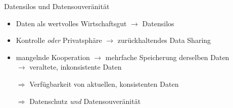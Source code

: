 \begin{frame}{Datensilos und Datensouveränität}
    \begin{itemize}
        \item Daten als wertvolles Wirtschaftsgut $\to$ Datensilos
        \item Kontrolle \emph{oder} Privatsphäre $\to$ zurückhaltendes Data Sharing
        \item mangelnde Kooperation $\to$ mehrfache Speicherung derselben Daten\\
              $\to$ veraltete, inkonsistente Daten
        
        \item[$\Rightarrow$] Verfügbarkeit von aktuellen, konsistenten Daten
        \item[$\Rightarrow$] Datenschutz \emph{und} Datensouveränität
    \end{itemize}
\end{frame}
